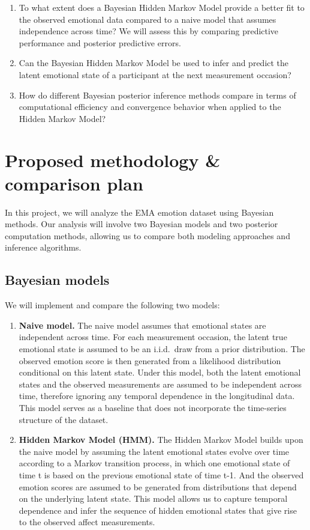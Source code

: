 \documentclass[a4paper,11pt]{article}
\begin{document}
\begin{enumerate}
    \item To what extent does a Bayesian Hidden Markov Model provide a better fit to the observed emotional data compared to a naive model that assumes independence across time? We will assess this by comparing predictive performance and posterior predictive errors.

    \item Can the Bayesian Hidden Markov Model be used to infer and predict the latent emotional state of a participant at the next measurement occasion?

    \item How do different Bayesian posterior inference methods compare in terms of computational efficiency and convergence behavior when applied to the Hidden Markov Model?
\end{enumerate}
\section{Proposed methodology \& comparison plan}

In this project, we will analyze the EMA emotion dataset using Bayesian methods. 
Our analysis will involve two Bayesian models and two posterior computation methods, 
allowing us to compare both modeling approaches and inference algorithms.

\subsection{Bayesian models}

We will implement and compare the following two models:

\begin{enumerate}

\item \textbf{Naive model.}  
The naive model assumes that emotional states are independent across time. 
For each measurement occasion, the latent true emotional state is assumed to be an i.i.d.\ draw from a prior distribution. 
The observed emotion score is then generated from a likelihood distribution conditional on this latent state. 
Under this model, both the latent emotional states and the observed measurements are assumed to be independent across time, 
therefore ignoring any temporal dependence in the longitudinal data. 
This model serves as a baseline that does not incorporate the time-series structure of the dataset.

\item \textbf{Hidden Markov Model (HMM).}  
The Hidden Markov Model builds upon the naive model by assuming the latent emotional states evolve over time 
according to a Markov transition process, in which one emotional state of time t is based on the previous emotional state of time t-1. And the observed emotion scores are assumed to be 
generated from distributions that depend on the underlying latent state. This model 
allows us to capture temporal dependence and infer the sequence of hidden emotional 
states that give rise to the observed affect measurements.

\end{enumerate}
\end{document}
